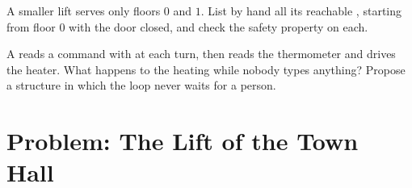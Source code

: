 \begin{exercise}[$\star\star\star$]\label{exo:g10:sensors-actuators-control:14}
A smaller lift serves only floors $0$ and $1$. List by hand all its reachable , starting from floor $0$ with the
door closed, and check the safety property on each.
\end{exercise}

\begin{exercise}[$\star\star\star$]\label{exo:g10:sensors-actuators-control:15}
A  reads a command with  at each turn, then reads the thermometer and drives the heater.
What happens to the heating while nobody types anything? Propose a structure in which the loop never waits for a
person.
\end{exercise}

\section{Problem: The Lift of the Town Hall}\label{sec:g10:sensors-actuators-control:problem}

